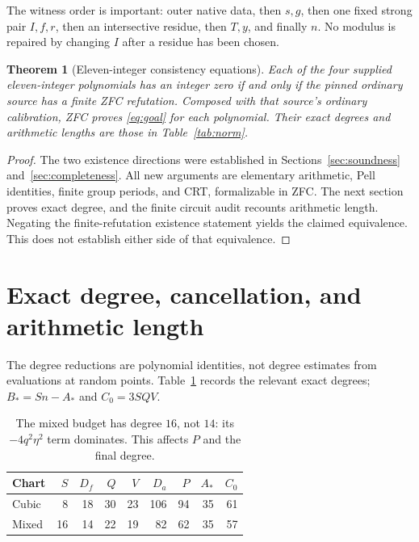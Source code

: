 \documentclass[11pt]{article}
\newtheorem{theorem}{Theorem}[section]
\theoremstyle{definition}
\theoremstyle{remark}
\begin{document}
The witness order is important: outer native data, then $s,g$, then
one fixed strong pair $I,f,r$, then an intersective residue, then
$T,y$, and finally $n$. No modulus is repaired by changing $I$
after a residue has been chosen.

\begin{theorem}[Eleven-integer consistency equations]\label{thm:main}
Each of the four supplied eleven-integer polynomials has an integer
zero if and only if the pinned ordinary source has a finite ZFC
refutation. Composed with that source's ordinary calibration, ZFC
proves \eqref{eq:goal} for each polynomial. Their exact degrees and
arithmetic lengths are those in Table~\ref{tab:norm}.
\end{theorem}
\begin{proof}
The two existence directions were established in
Sections~\ref{sec:soundness} and~\ref{sec:completeness}. All new
arguments are elementary arithmetic, Pell identities, finite group
periods, and CRT, formalizable in ZFC. The next section proves exact
degree, and the finite circuit audit recounts arithmetic length.
Negating the finite-refutation existence statement yields the claimed
equivalence. This does not establish either side of that equivalence.
\end{proof}

\section{Exact degree, cancellation, and arithmetic length}
\label{sec:degree}

The degree reductions are polynomial identities, not degree estimates
from evaluations at random points. Table~\ref{tab:degrees} records the
relevant exact degrees; $B_*=Sn-A_*$ and $C_0=3SQV$.

\begin{table}[ht]
\centering
\begin{tabular}{lrrrrrrrr}
\toprule
Chart & $S$ & $D_f$ & $Q$ & $V$ & $D_a$ & $P$ & $A_*$ & $C_0$\\
\midrule
Cubic & 8 & 18 & 30 & 23 & 106 & 94 & 35 & 61\\
Mixed & 16 & 14 & 22 & 19 & 82 & 62 & 35 & 57\\
\bottomrule
\end{tabular}
\caption{The mixed budget has degree $16$, not $14$: its
$-4q^2\eta^2$ term dominates. This affects $P$ and the final degree.}
\label{tab:degrees}
\end{table}
\end{document}
